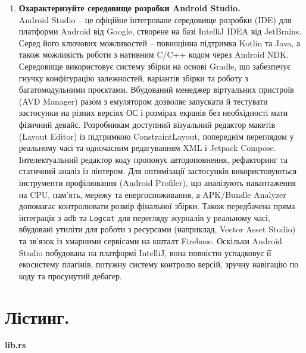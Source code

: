 \documentclass[14pt, a4paper]{extreport}
\begin{document}
\begin{enumerate}
		\item \textbf{Охарактеризуйте середовище розробки Android Studio.} \\ Android Studio -- це офіційне інтегроване середовище розробки (IDE) для платформи Android від Google, створене на базі IntelliJ IDEA від JetBrains. Серед його ключових можливостей -- повноцінна підтримка Kotlin та Java, а також можливість роботи з нативним C/C++ кодом через Android NDK. Середовище використовує систему збірки на основі Gradle, що забезпечує гнучку конфігурацію залежностей, варіантів збірки та роботу з багатомодульними проєктами. Вбудований менеджер віртуальних пристроїв (AVD Manager) разом з емулятором дозволяє запускати й тестувати застосунки на різних версіях ОС і розмірах екранів без необхідності мати фізичний девайс. Розробникам доступний візуальний редактор макетів (Layout Editor) із підтримкою ConstraintLayout, попереднім переглядом у реальному часі та одночасним редагуванням XML і Jetpack Compose. Інтелектуальний редактор коду пропонує автодоповнення, рефакторинг та статичний аналіз із лінтером. Для оптимізації застосунків використовуються інструменти профілювання (Android Profiler), що аналізують навантаження на CPU, пам'ять, мережу та енергоспоживання, а APK/Bundle Analyzer допомагає контролювати розмір фінальної збірки. Також передбачена пряма інтеграція з \texttt{adb} та \texttt{Logcat} для перегляду журналів у реальному часі, вбудовані утиліти для роботи з ресурсами (наприклад, Vector Asset Studio) та зв'язок із хмарними сервісами на кшталт Firebase. Оскільки Android Studio побудована на платформі IntelliJ, вона повністю успадковує її екосистему плагінів, потужну систему контролю версій, зручну навігацію по коду та просунутий дебагер.
	\end{enumerate}

	\pagebreak

	\section*{Лістинг.}

	\textbf{lib.rs}
\end{document}
